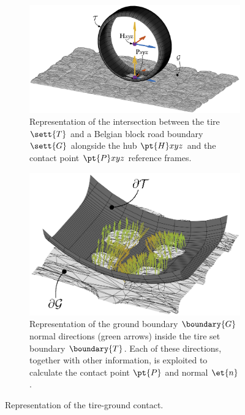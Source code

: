\begin{figure}
  \begin{subfigure}[t]{0.475\textwidth}
    \centering
    \includegraphics[width=1.0\textwidth, trim={5cm 2.3cm 5cm 0cm}, clip]{./figures/appendix_2/road_shell_ipe}
    \caption{Representation of the intersection between the tire $\sett{T}$ and a Belgian block road boundary $\sett{G}$ alongside the hub $\pt{H}xyz$ and the contact point $\pt{P}xyz$ reference frames.}
    \label{app2:fig:tire_shell}
  \end{subfigure}
  \hfill%
  \begin{subfigure}[t]{0.475\textwidth}
    \centering
    \includegraphics[width=1.0\textwidth]{./figures/appendix_2/zoom_ipe}
    \caption{Representation of the ground boundary $\boundary{G}$ normal directions (green arrows) inside the tire set boundary $\boundary{T}$. Each of these directions, together with other information, is exploited to calculate the contact point $\pt{P}$ and normal $\et{n}$.}
    \label{app2:fig:zoom}
  \end{subfigure}
  \caption{Representation of the tire-ground contact.}
  \label{app2:fig:tire_ground}
\end{figure}

